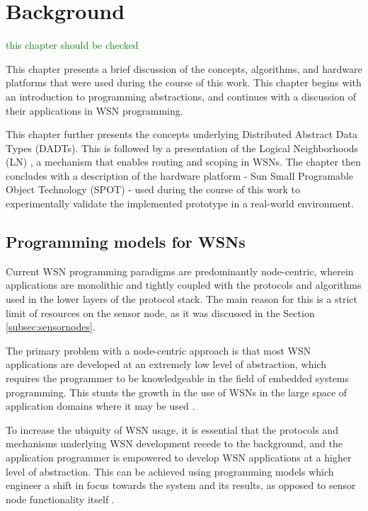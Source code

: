 \chapter{Background}


\textcolor{green}{this chapter should be checked}

This chapter presents a brief discussion of the concepts, algorithms, and 
hardware platforms that were used during the course of this work. This
chapter begins with an introduction to programming abstractions, and continues
with a discussion of their applications in WSN programming.

This chapter further presents the concepts underlying
Distributed Abstract Data Types (DADTs). This is followed by a presentation of
the Logical Neighborhoods (LN) \cite{mottola_LNScoping:2006}, a mechanism that
enables routing and scoping in WSNs. The chapter then concludes 
with a description of the hardware platform - Sun Small Programable Object
Technology (SPOT) \cite{simon_squawk:2006} - used during the course of this work
to experimentally validate the implemented prototype in a
real-world environment. 

\section {Programming models for WSNs}

Current WSN programming paradigms are predominantly node-centric, wherein
applications are monolithic and tightly coupled with the protocols and algorithms
used in the lower layers of the protocol stack. 
The main reason for this is a strict limit of resources on the sensor node, as
it was discussed in the Section \ref{subsec:sensornodes}.

The primary problem with a node-centric approach is that most WSN applications
are developed at an extremely low level of abstraction, which requires the programmer to be knowledgeable in the field of
embedded systems programming. This stunts the growth in the use of WSNs in the
large space of application domains where it may be used
\cite{mottola_middleware:2008}. 

To increase the ubiquity of WSN
usage, it is essential that the protocols and mechanisms underlying WSN
development recede to the background, and the application programmer is
empowered to develop WSN applications at a higher level of abstraction. This
can be achieved using programming models which engineer a shift in focus
towards the system and its results, as opposed to sensor node functionality
itself \cite{mottola_middleware:2008}. 

